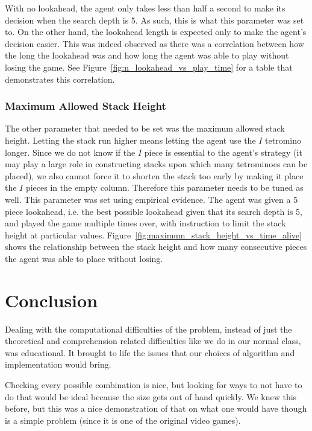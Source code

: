 \documentclass[fontsize=12pt]{article}
\begin{document}
\par With no lookahead, the agent only takes less than half a second to make its decision when the search depth is 5. As such, this is what this parameter was set to. On the other hand, the lookahead length is expected only to make the agent's decision easier. This was indeed observed as there was a correlation between how the long the lookahead was and how long the agent was able to play without losing the game. See Figure~\ref{fig:n_lookahead_vs_play_time} for a table that demonstrates this correlation.

\subsubsection{Maximum Allowed Stack Height}
\label{ssub:maximum_allowed_stack_height}
\par The other parameter that needed to be set was the maximum allowed stack height. Letting the stack run higher means letting the agent use the $I$ tetromino longer. Since we do not know if the $I$ piece is essential to the agent's strategy (it may play a large role in constructing stacks upon which many tetrominoes can be placed), we also cannot force it to shorten the stack too early by making it place the $I$ pieces in the empty column. Therefore this parameter needs to be tuned as well. This parameter was set using empirical evidence. The agent was given a 5 piece lookahead, i.e. the best possible lookahead given that its search depth is 5, and played the game multiple times over, with instruction to limit the stack height at particular values. Figure~\ref{fig:maximum_stack_height_vs_time_alive} shows the relationship between the stack height and how many consecutive pieces the agent was able to place without losing.

\section{Conclusion}
\label{sec:conclusion}

\par Dealing with the computational difficulties of the problem, instead of just the theoretical and comprehension related difficulties like we do in our normal class, was educational. It brought to life the issues that our choices of algorithm and implementation would bring.

\par Checking every possible combination is nice, but looking for ways to not have to do that would be ideal because the size gets out of hand quickly. We knew this before, but this was a nice demonstration of that on what one would have though is a simple problem (since it is one of the original video games).
\end{document}
